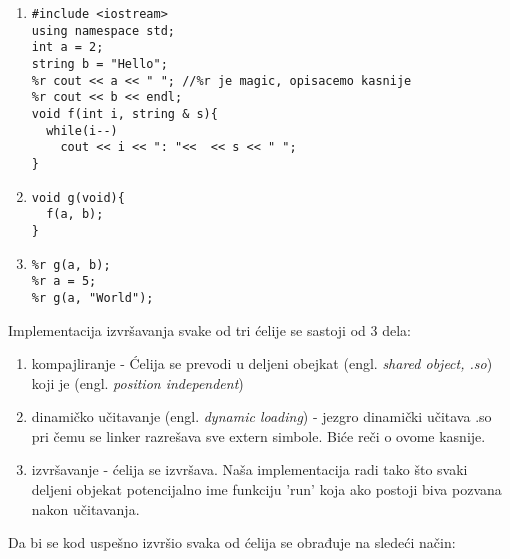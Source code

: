 \documentclass[a4paper]{article}
\newcommand{\eng}[1]{(engl. \textit{#1})}
\begin{document}
{\begin{enumerate}

\item 
\begin{verbatim}
#include <iostream>
using namespace std;
int a = 2;
string b = "Hello";
%r cout << a << " "; //%r je magic, opisacemo kasnije
%r cout << b << endl;
void f(int i, string & s){
  while(i--)
    cout << i << ": "<<  << s << " ";
}
\end{verbatim}


\item 
\begin{verbatim}
void g(void){
  f(a, b);
}
\end{verbatim}


\item 
\begin{verbatim}
%r g(a, b);
%r a = 5;
%r g(a, "World");
\end{verbatim}

\end{enumerate}


Implementacija izvršavanja svake od tri ćelije se sastoji od 3 dela:
\begin{enumerate}
  \item kompajliranje - Ćelija se prevodi u deljeni obejkat \eng{shared object, .so}
    koji je \eng{position independent}
  \item dinamičko učitavanje \eng{dynamic loading} - jezgro dinamički učitava .so pri čemu se
    linker razrešava sve extern simbole. Biće reči o ovome kasnije.
\item izvršavanje - ćelija se izvršava. Naša implementacija radi tako što svaki deljeni objekat potencijalno
  ime funkciju 'run' koja ako postoji biva pozvana nakon učitavanja.
\end{enumerate}

Da bi se kod uspešno izvršio svaka od ćelija se obrađuje na sledeći način:

}
\end{document}
